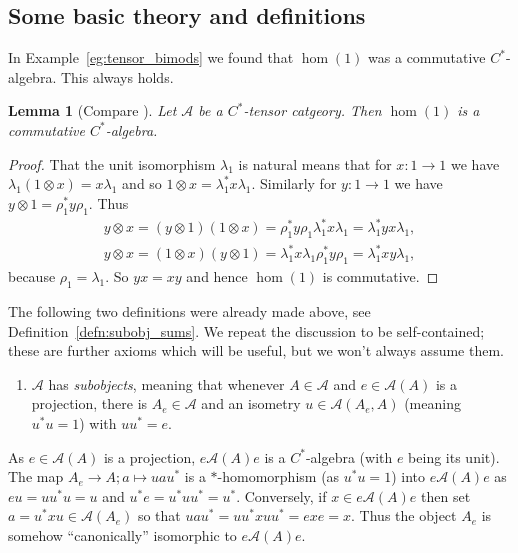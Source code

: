 \documentclass[a4paper,11pt]{article}
\theoremstyle{plain}
\newtheorem{lemma}[proposition]{Lemma}
\theoremstyle{remark}
\newcommand{\mc}[1]{\mathcal{#1}}
\begin{document}
\subsection{Some basic theory and definitions}

In Example~\ref{eg:tensor_bimods} we found that $\hom(1)$ was a commutative $C^*$-algebra.  This always holds.

\begin{lemma}[Compare {\cite[Proposition 2.2.10.]{EGNO_TensorCategories}}]\label{lem:hom1_comm}
Let $\mc A$ be a $C^*$-tensor catgeory.  Then $\hom(1)$ is a commutative $C^*$-algebra.
\end{lemma}
\begin{proof}
That the unit isomorphism $\lambda_1$ is natural means that for $x\colon 1\to 1$ we have $\lambda_1(1\otimes x) = x \lambda_1$ and so $1\otimes x = \lambda_1^* x \lambda_1$.  Similarly for $y\colon 1\to 1$ we have $y\otimes 1 = \rho_1^* y \rho_1$.  Thus
\begin{align*}
y\otimes x = (y\otimes 1)(1\otimes x) = \rho_1^* y \rho_1 \lambda_1^* x \lambda_1 = \lambda_1^* yx \lambda_1, \\
y\otimes x = (1\otimes x)(y\otimes 1) =  \lambda_1^* x \lambda_1 \rho_1^* y \rho_1= \lambda_1^* xy \lambda_1,
\end{align*}
because $\rho_1 = \lambda_1$.  So $yx = xy$ and hence $\hom(1)$ is commutative.
\end{proof}

The following two definitions were already made above, see Definition~\ref{defn:subobj_sums}.  We repeat the discussion to be self-contained; these are further axioms which will be useful, but we won't always assume them.

\begin{enumerate}[(1), start=9]
  \item\label{cst-axioms:9} $\mc A$ has \emph{subobjects}, meaning that whenever $A\in\mc A$ and $e\in \mc A(A)$ is a projection, there is $A_e \in \mc A$ and an isometry $u\in\mc A(A_e, A)$ (meaning $u^*u=1$) with $uu^* = e$.
\end{enumerate}

As $e\in\mc A(A)$ is a projection, $e \mc A(A) e$ is a $C^*$-algebra (with $e$ being its unit).   The map $A_e \to A; a \mapsto u a u^*$ is a $*$-homomorphism (as $u^*u=1$) into $e\mc A(A)e$ as $eu = uu^*u = u$ and $u^*e = u^*uu^* = u^*$.  Conversely, if $x\in e\mc A(A)e$ then set $a = u^*xu \in \mc A(A_e)$ so that $uau^* = uu^* x uu^* = exe = x$.  Thus the object $A_e$ is somehow ``canonically'' isomorphic to $e \mc A(A) e$.
\end{document}
